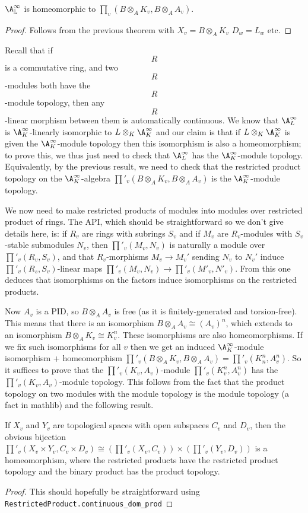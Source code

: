 \begin{corollary} $\mathbb{\A_L^\infty}$ is homeomorphic to $\prod_v(B\otimes_AK_v,B\otimes_AA_v)$.
\end{corollary}
\begin{proof} Follows from the previous theorem with $X_v=B\otimes_AK_v$ $D_w=L_w$ etc.
\end{proof}

Recall that if $$R$$ is a commutative ring, and two $$R$$-modules both have the $$R$$-module
topology, then any $$R$$-linear morphism between them is automatically continuous. We know
that $\A_L^\infty$ is $\A_K^\infty$-linearly isomorphic to $L\otimes_K\A_K^\infty$ and our claim is that
if $L\otimes_K\A_K^\infty$ is given the $\A_K^\infty$-module topology then this isomorphism is also a
homeomorphism; to prove this, we thus just need to check that $\A_L^\infty$ has the $\A_K^\infty$-module
topology. Equivalently, by the previous result, we need to check that
the restricted product topology on the $\A_K^\infty$-algebra $\prod'_v(B\otimes_AK_v,B\otimes_AA_v)$
is the $\A_K^\infty$-module topology.

We now need to make restricted products of modules into modules over restricted product of rings.
The API, which should be straightforward so we don't give details here, is: if $R_v$ are rings
with subrings $S_v$ and if $M_v$ are $R_v$-modules with $S_v$-stable submodules $N_v$, then
$\prod'_v(M_v,N_v)$ is naturally a module over $\prod'_v(R_v,S_v)$, and that $R_v$-morphisms
$M_v\to M_v'$ sending $N_v$ to $N_v'$ induce $\prod'_v(R_s,S_v)$-linear maps
$\prod'_v(M_v,N_v)\to\prod'_v(M'_v,N'_v)$. From this one deduces that isomorphisms on the factors
induce isomorphisms on the restricted products.


Now $A_v$ is a PID, so $B\otimes_AA_v$ is free (as it is finitely-generated and torsion-free).
This means that there is an isomorphism $B\otimes_AA_v\cong(A_v)^n$, which extends to an isomorphism
$B\otimes_AK_v\cong K_v^n$. These isomorphisms are also homeomorphisms. If we fix such isomorphisms
for all $v$ then we get an induced $\A_K^\infty$-module isomorphism + homeomorphism
$\prod'_v(B\otimes_AK_v,B\otimes_AA_v)=\prod'_v(K_n^n,A_v^n)$. So it suffices to prove
that the $\prod'_v(K_v,A_v)$-module $\prod'_v(K_v^n,A_v^n)$ has the $\prod'_v(K_v,A_v)$-module
topology. This follows from the fact that the product topology on two modules with the
module topology is the module topology (a fact in mathlib) and the following result.

\begin{lemma}
  If $X_v$ and $Y_v$ are topological spaces with open subspaces $C_v$ and $D_v$, then
  the obvious bijection $\prod'_v(X_v \times Y_v,C_v\times D_v) \cong
  \left(\prod'_v(X_v,C_v)\right)\times\left(\prod'_v(Y_v,D_v)\right)$ is a homeomorphism,
  where the restricted products have the restricted product topology and the binary
  product has the product topology.
\end{lemma}
\begin{proof} This should hopefully be straightforward using {\tt RestrictedProduct.continuous\_dom\_prod}
\end{proof}

